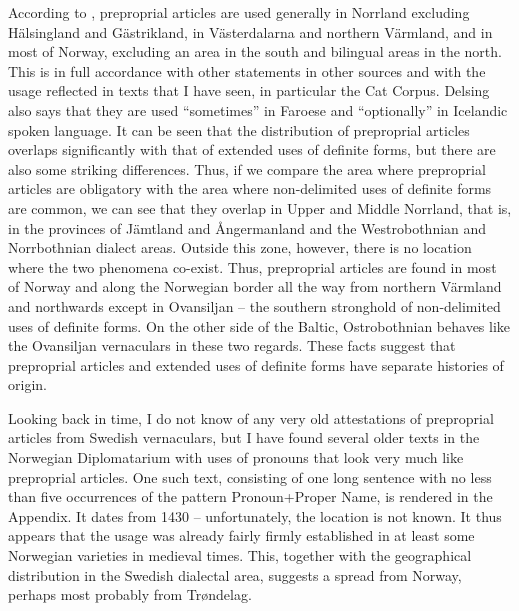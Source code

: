 
According to \citet[21]{Delsing2003a}, preproprial articles are used generally in Norrland excluding Hälsingland and Gästrikland, in Västerdalarna and northern Värmland, and in most of Norway, excluding an area in the south and bilingual areas in the north. This is in full accordance with other statements in other sources and with the usage reflected in texts that I have seen, in particular the Cat Corpus. Delsing also says that they are used “sometimes” in Faroese and “optionally” in Icelandic spoken language. It can be seen that the distribution of preproprial articles overlaps significantly with that of extended uses of definite forms, but there are also some striking differences. Thus, if we compare the area where preproprial articles are obligatory with the area where non-delimited uses of definite forms are common, we can see that they overlap in Upper and Middle Norrland, that is, in the provinces of Jämtland and Ångermanland and the Westrobothnian and Norrbothnian dialect areas. Outside this zone, however, there is no location where the two phenomena co-exist. Thus, preproprial articles are found in most of Norway and along the Norwegian border all the way from northern Värmland and northwards except in Ovansiljan – the southern stronghold of non-delimited uses of definite forms. On the other side of the Baltic, Ostrobothnian behaves like the Ovansiljan vernaculars in these two regards. These facts suggest that preproprial articles and extended uses of definite forms have separate histories of origin.


Looking back in time, I do not know of any very old attestations of preproprial articles from Swedish vernaculars, but I have found several older texts in the Norwegian Diplomatarium with uses of pronouns that look very much like preproprial articles. One such text, consisting of one long sentence with no less than five occurrences of the pattern Pronoun+Proper Name, is rendered in the Appendix. It dates from 1430 – unfortunately, the location is not known. It thus appears that the usage was already fairly firmly established in at least some Norwegian varieties in medieval times. This, together with the geographical distribution in the Swedish dialectal area, suggests a spread from Norway, perhaps most probably from Trøndelag.

